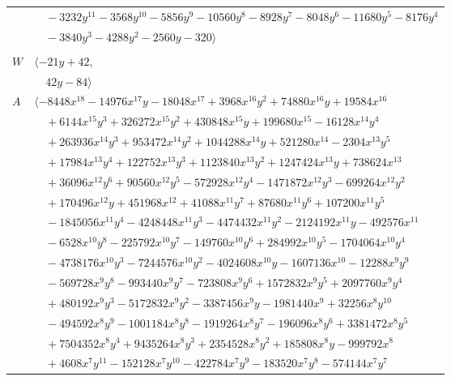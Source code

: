 \documentclass[11pt]{article}
\begin{document}
\begin{longtable}{@{}ll@{}}
 & $\quad -3232y^{11}-3568y^{10}-5856y^{9}-10560y^{8}-8928y^{7}-8048y^{6}-11680y^{5}-8176y^{4}$\\
 & $\quad -3840y^{3}-4288y^{2}-2560y-320\rangle$\\
\addlinespace[2pt]
\multicolumn{2}{@{}p{0.97\textwidth}@{}}{$i=14$, $D_i=4$, $\rho_{ij}$: $16{:}2, \allowbreak 18{:}1, \allowbreak 19{:}2, \allowbreak 21{:}2, \allowbreak 23{:}2, \allowbreak 24{:}1, \allowbreak 26{:}1, \allowbreak 30{:}1, \allowbreak 32{:}1, \allowbreak 36{:}2, \allowbreak 37{:}2, \allowbreak 40{:}2, \allowbreak 45{:}1, \allowbreak 58{:}1$}\\
$W$ & $\langle -21y+42,$\\
 & $\quad 42y-84\rangle$\\
$A$ & $\langle -8448x^{18}-14976x^{17}y-18048x^{17}+3968x^{16}y^{2}+74880x^{16}y+19584x^{16}$\\
 & $\quad +6144x^{15}y^{3}+326272x^{15}y^{2}+430848x^{15}y+199680x^{15}-16128x^{14}y^{4}$\\
 & $\quad +263936x^{14}y^{3}+953472x^{14}y^{2}+1044288x^{14}y+521280x^{14}-2304x^{13}y^{5}$\\
 & $\quad +17984x^{13}y^{4}+122752x^{13}y^{3}+1123840x^{13}y^{2}+1247424x^{13}y+738624x^{13}$\\
 & $\quad +36096x^{12}y^{6}+90560x^{12}y^{5}-572928x^{12}y^{4}-1471872x^{12}y^{3}-699264x^{12}y^{2}$\\
 & $\quad +170496x^{12}y+451968x^{12}+41088x^{11}y^{7}+87680x^{11}y^{6}+107200x^{11}y^{5}$\\
 & $\quad -1845056x^{11}y^{4}-4248448x^{11}y^{3}-4474432x^{11}y^{2}-2124192x^{11}y-492576x^{11}$\\
 & $\quad -6528x^{10}y^{8}-225792x^{10}y^{7}-149760x^{10}y^{6}+284992x^{10}y^{5}-1704064x^{10}y^{4}$\\
 & $\quad -4738176x^{10}y^{3}-7244576x^{10}y^{2}-4024608x^{10}y-1607136x^{10}-12288x^{9}y^{9}$\\
 & $\quad -569728x^{9}y^{8}-993440x^{9}y^{7}-723808x^{9}y^{6}+1572832x^{9}y^{5}+2097760x^{9}y^{4}$\\
 & $\quad +480192x^{9}y^{3}-5172832x^{9}y^{2}-3387456x^{9}y-1981440x^{9}+32256x^{8}y^{10}$\\
 & $\quad -494592x^{8}y^{9}-1001184x^{8}y^{8}-1919264x^{8}y^{7}-196096x^{8}y^{6}+3381472x^{8}y^{5}$\\
 & $\quad +7504352x^{8}y^{4}+9435264x^{8}y^{3}+2354528x^{8}y^{2}+185808x^{8}y-999792x^{8}$\\
 & $\quad +4608x^{7}y^{11}-152128x^{7}y^{10}-422784x^{7}y^{9}-183520x^{7}y^{8}-574144x^{7}y^{7}$\\

\end{longtable}
\end{document}
